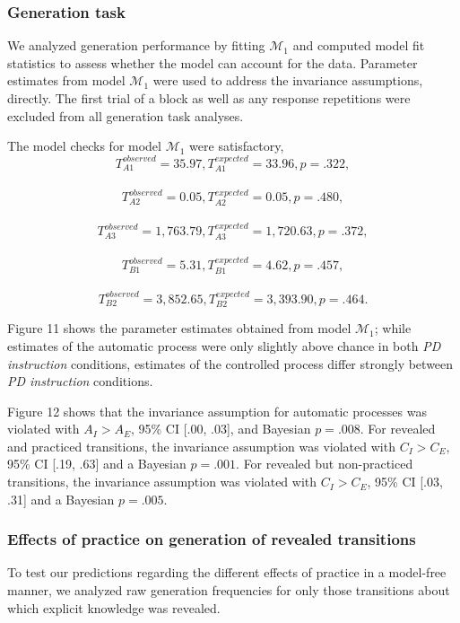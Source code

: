 \documentclass[floatsintext,man]{apa6}
\begin{document}
\subsubsection{Generation task}\label{generation-task-2}

We analyzed generation performance by fitting \(\mathcal{M}_1\) and
computed model fit statistics to assess whether the model can account
for the data. Parameter estimates from model \(\mathcal{M}_1\) were used
to address the invariance assumptions, directly. The first trial of a
block as well as any response repetitions were excluded from all
generation task analyses.

The model checks for model \(\mathcal{M}_1\) were satisfactory,
\[T_{A1}^{observed} = 35.97, T_{A1}^{expected} = 33.96, p = .322,\]~
\[T_{A2}^{observed} = 0.05, T_{A2}^{expected} = 0.05, p = .480,\]~
\[T_{A3}^{observed} = 1,763.79, T_{A3}^{expected} = 1,720.63, p = .372,\]~
\[T_{B1}^{observed} = 5.31, T_{B1}^{expected} = 4.62, p = .457,\]~
\[T_{B2}^{observed} = 3,852.65, T_{B2}^{expected} = 3,393.90, p = .464.\]

Figure 11 shows the parameter estimates obtained from model
\(\mathcal{M}_1\); while estimates of the automatic process were only
slightly above chance in both \emph{PD instruction} conditions,
estimates of the controlled process differ strongly between \emph{PD
instruction} conditions.

Figure 12 shows that the invariance assumption for automatic processes
was violated with \(A_I > A_E\), 95\% CI {[}.00, .03{]}, and Bayesian
\(p = .008\). For revealed and practiced transitions, the invariance
assumption was violated with \(C_I > C_E\), 95\% CI {[}.19, .63{]} and a
Bayesian \(p = .001\). For revealed but non-practiced transitions, the
invariance assumption was violated with \(C_I > C_E\), 95\% CI {[}.03,
.31{]} and a Bayesian \(p = .005\).



\subsubsection{Effects of practice on generation of revealed
transitions}\label{effects-of-practice-on-generation-of-revealed-transitions}

To test our predictions regarding the different effects of practice in a
model-free manner, we analyzed raw generation frequencies for only those
transitions about which explicit knowledge was revealed.
\end{document}
